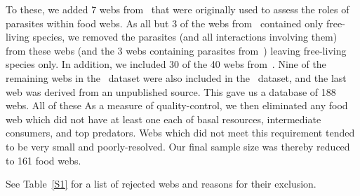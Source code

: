 \documentclass[12pt]{article}
\begin{document}
  To these, we added 7 webs from~\cite{Dunne2013} that were originally used
  to assess the roles of parasites within food webs. As all but 3 of the webs
  from~\cite{GlobalWeb} contained only free-living species, we removed
  the parasites (and all interactions involving them) from these webs (and the
  3 webs containing parasites from~\cite{GlobalWeb}) leaving free-living
  species only. In addition, we included 30 of the 40 webs
  from~\cite{Riede2011}. Nine of the
  remaining webs in the~\cite{Riede2011} dataset were also included in
  the~\cite{GlobalWeb}  dataset, and the last web was derived from an
  unpublished source. This gave us a database of 188 webs. All of these 
  As a measure of
  quality-control, we then eliminated any food web which did not have at least
  one each of basal resources, intermediate consumers, and top predators. Webs
  which did not meet this requirement tended to be very small and poorly-resolved.
  Our final sample size was thereby reduced to 161 food webs.



 See Table~\ref{S1} for a list of rejected webs and reasons for their
  exclusion. 
\end{document}
